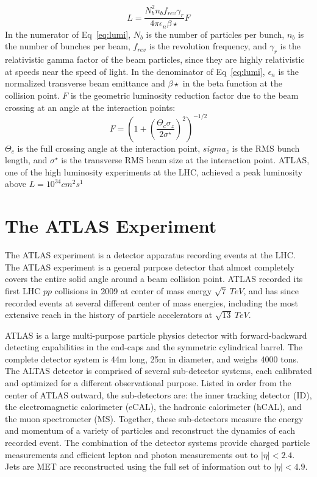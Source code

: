 \begin{equation}
L=\frac{N_b^2n_bf_{rev}\gamma_r}{4\pi\epsilon_n\beta\star}F
\label{eq:lumi}
\end{equation}
In the numerator of Eq~\ref{eq:lumi}, $N_b$ is the number of particles per bunch, $n_b$ is the number of bunches per beam, $f_{rev}$ is the revolution frequency, and $\gamma_r$ is the relativistic gamma factor of the beam particles, since they are highly relativistic at speeds near the speed of light.  In the denominator of Eq~\ref{eq:lumi}, $\epsilon_n$ is the normalized transverse beam emittance and $\beta\star$ in the beta function at the collision point.  $F$ is the geometric luminosity reduction factor due to the beam crossing at an angle at the interaction points:
\begin{equation}
F=(1+(\frac{\Theta_c\sigma_z}{2\sigma^{\star}})^2)^{-1/2}
\label{eq:reduction}
\end{equation}
$\Theta_c$ is the full crossing angle at the interaction point, $sigma_z$ is the RMS bunch length, and $\sigma^{\star}$ is the transverse RMS beam size at the interaction point.  ATLAS, one of the high luminosity experiments at the LHC, achieved a peak luminosity above $L=10^{34}cm^2s^1$
 
 
 
\section{The ATLAS Experiment}

The ATLAS experiment is a detector apparatus recording events at the LHC. The ATLAS experiment is a general purpose detector that almost completely covers the entire solid angle around a beam collision point.  ATLAS recorded its first LHC $pp$ collisions in 2009 at center of mass energy $\sqrt{7}~TeV$, and has since recorded events at several different center of mass energies, including the most extensive reach in the history of particle accelerators at $\sqrt{13}~TeV$.

ATLAS is a large multi-purpose particle physics detector with forward-backward detecting capabilities in the end-caps and the symmetric cylindrical barrel.  The complete detector system is 44m long, 25m in diameter, and weighs 4000 tons.  The ALTAS detector is comprised of several sub-detector systems, each calibrated and optimized for a different observational purpose.  Listed in order from the center of ATLAS outward, the sub-detectors are: the inner tracking detector (ID), the electromagnetic calorimeter (eCAL), the hadronic calorimeter (hCAL), and the muon spectrometer (MS).  Together, these sub-detectors measure the energy and momentum of a variety of particles and reconstruct the dynamics of each recorded event.  The combination of the detector systems provide charged particle measurements and efficient lepton and photon measurements out to $|\eta| < 2.4$.  Jets are MET are reconstructed using the full set of information out to $|\eta| < 4.9$.  

